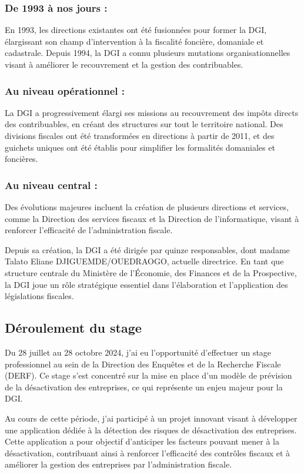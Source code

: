 \documentclass[a4paper,12pt]{report}
\begin{document}
\subsubsection*{De 1993 à nos jours :}  
En 1993, les directions existantes ont été fusionnées pour former la DGI, élargissant son champ d'intervention à la fiscalité foncière, domaniale et cadastrale. Depuis 1994, la DGI a connu plusieurs mutations organisationnelles visant à améliorer le recouvrement et la gestion des contribuables.

\subsubsection*{Au niveau opérationnel :}  
La DGI a progressivement élargi ses missions au recouvrement des impôts directs des contribuables, en créant des structures sur tout le territoire national. Des divisions fiscales ont été transformées en directions à partir de 2011, et des guichets uniques ont été établis pour simplifier les formalités domaniales et foncières.

\subsubsection*{Au niveau central :}  
Des évolutions majeures incluent la création de plusieurs directions et services, comme la Direction des services fiscaux et la Direction de l’informatique, visant à renforcer l’efficacité de l’administration fiscale.

Depuis sa création, la DGI a été dirigée par quinze responsables, dont madame Talato Eliane DJIGUEMDE/OUEDRAOGO, actuelle directrice. En tant que structure centrale du Ministère de l’Économie, des Finances et de la Prospective, la DGI joue un rôle stratégique essentiel dans l'élaboration et l'application des législations fiscales.

\subsection*{Déroulement du stage}

Du 28 juillet au 28 octobre 2024, j'ai eu l'opportunité d'effectuer un stage professionnel au sein de la Direction des Enquêtes et de la Recherche Fiscale (DERF). Ce stage s'est concentré sur la mise en place d'un modèle de prévision de la désactivation des entreprises, ce qui représente un enjeu majeur pour la DGI.

Au cours de cette période, j'ai participé à un projet innovant visant à développer une application dédiée à la détection des risques de désactivation des entreprises. Cette application a pour objectif d'anticiper les facteurs pouvant mener à la désactivation, contribuant ainsi à renforcer l’efficacité des contrôles fiscaux et à améliorer la gestion des entreprises par l’administration fiscale.
\end{document}
